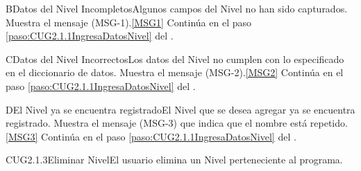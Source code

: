 	\begin{UCtrayectoriaA}{B}{Datos del Nivel Incompletos}{Algunos campos del Nivel no han sido capturados.}
			\UCpaso Muestra el mensaje (MSG-1).\ref{MSG1}
			\UCpaso Continúa en el paso \ref{paso:CUG2.1.1IngresaDatosNivel} del .
	\end{UCtrayectoriaA}

	\begin{UCtrayectoriaA}{C}{Datos del Nivel Incorrectos}{Los datos del Nivel no cumplen con lo especificado en el diccionario de datos.}
			\UCpaso Muestra el mensaje (MSG-2).\ref{MSG2}
			\UCpaso Continúa en el paso \ref{paso:CUG2.1.1IngresaDatosNivel} del .
	\end{UCtrayectoriaA}

		\begin{UCtrayectoriaA}{D}{El Nivel ya se encuentra registrado}{El Nivel que se desea agregar ya se encuentra registrado.}
			\UCpaso Muestra el mensaje (MSG-3) que indica que el nombre está repetido.\ref{MSG3}
			\UCpaso Continúa en el paso \ref{paso:CUG2.1.1IngresaDatosNivel} del .
		\end{UCtrayectoriaA}

	\begin{UseCase}{CUG2.1.3}{Eliminar Nivel}{El usuario elimina un Nivel perteneciente al programa.}
	\end{UseCase}

